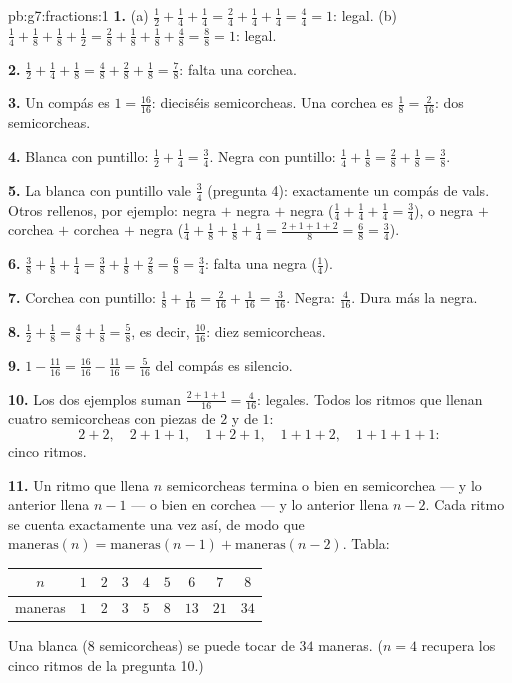 \begin{solution}{pb:g7:fractions:1}
\textbf{1.} (a) $\frac12 + \frac14 + \frac14 = \frac24 + \frac14
+ \frac14 = \frac44 = 1$: legal. (b) $\frac14 + \frac18 +
\frac18 + \frac12 = \frac28 + \frac18 + \frac18 + \frac48 =
\frac88 = 1$: legal.

\textbf{2.} $\frac12 + \frac14 + \frac18 = \frac48 + \frac28 +
\frac18 = \frac78$: falta una corchea.

\textbf{3.} Un compás es $1 = \frac{16}{16}$: dieciséis
semicorcheas. Una corchea es $\frac18 = \frac{2}{16}$: dos semicorcheas.

\textbf{4.} Blanca con puntillo: $\frac12 + \frac14 = \frac34$. Negra
con puntillo: $\frac14 + \frac18 = \frac28 + \frac18 = \frac38$.

\textbf{5.} La blanca con puntillo vale $\frac34$ (pregunta 4):
exactamente un compás de vals. Otros rellenos, por ejemplo: negra
$+$ negra $+$ negra ($\frac14 + \frac14 + \frac14 =
\frac34$), o negra $+$ corchea $+$ corchea $+$ negra
($\frac14 + \frac18 + \frac18 + \frac14 = \frac{2 + 1 + 1 +
2}{8} = \frac68 = \frac34$).

\textbf{6.} $\frac38 + \frac18 + \frac14 = \frac38 + \frac18 +
\frac28 = \frac68 = \frac34$: falta una negra
($\frac14$).

\textbf{7.} Corchea con puntillo: $\frac18 + \frac{1}{16} =
\frac{2}{16} + \frac{1}{16} = \frac{3}{16}$. Negra:
$\frac{4}{16}$. Dura más la negra.

\textbf{8.} $\frac12 + \frac18 = \frac48 + \frac18 = \frac58$,
es decir, $\frac{10}{16}$: diez semicorcheas.

\textbf{9.} $1 - \frac{11}{16} = \frac{16}{16} - \frac{11}{16}
= \frac{5}{16}$ del compás es silencio.

\textbf{10.} Los dos ejemplos suman $\frac{2 + 1 + 1}{16} =
\frac{4}{16}$: legales. Todos los ritmos que llenan cuatro semicorcheas con
piezas de $2$ y de $1$:
\[
2{+}2, \quad 2{+}1{+}1, \quad 1{+}2{+}1, \quad 1{+}1{+}2, \quad
1{+}1{+}1{+}1 :
\]
cinco ritmos.

\textbf{11.} Un ritmo que llena $n$ semicorcheas termina o bien en
semicorchea --- y lo anterior llena $n - 1$ --- o bien en
corchea --- y lo anterior llena $n - 2$. Cada ritmo se
cuenta exactamente una vez así, de modo que
$\text{maneras}(n) = \text{maneras}(n-1) + \text{maneras}(n-2)$. Tabla:
\begin{center}
\renewcommand{\arraystretch}{1.2}
\begin{tabular}{c|cccccccc}
$n$ & $1$ & $2$ & $3$ & $4$ & $5$ & $6$ & $7$ & $8$ \\
\hline
maneras & $1$ & $2$ & $3$ & $5$ & $8$ & $13$ & $21$ & $34$ \\
\end{tabular}
\end{center}
Una blanca ($8$ semicorcheas) se puede tocar de $34$ maneras.
($n = 4$ recupera los cinco ritmos de la pregunta 10.)


\end{solution}
